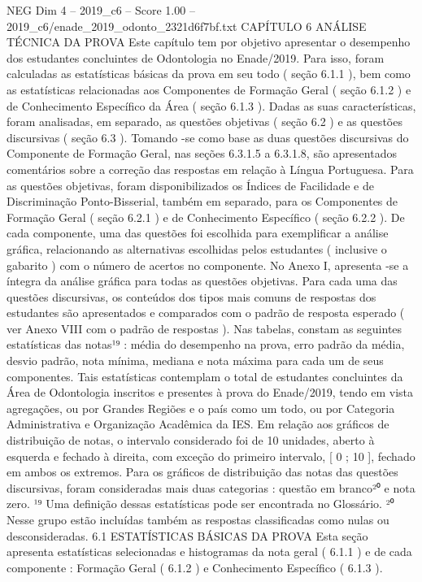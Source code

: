 \begin{textsample}{NEG Dim 4 – 2019\_c6 – Score 1.00 – 2019\_c6/enade\_2019\_odonto\_2321d6f7bf.txt}  \label{ex:f4_neg_259}
CAPÍTULO 6 ANÁLISE TÉCNICA DA PROVA Este capítulo tem por objetivo apresentar o desempenho dos estudantes concluintes de Odontologia no Enade/2019.
Para isso, foram calculadas as estatísticas básicas da prova em seu todo ( seção 6.1.1 ), bem como as estatísticas relacionadas aos Componentes de Formação Geral ( seção 6.1.2 ) e de Conhecimento Específico da Área ( seção 6.1.3 ).
Dadas as suas características, foram analisadas, em separado, as questões objetivas ( seção 6.2 ) e as questões discursivas ( seção 6.3 ).
Tomando -se como base as duas questões discursivas do Componente de Formação Geral, nas seções 6.3.1.5 a 6.3.1.8, são apresentados comentários sobre a correção das respostas em relação à Língua Portuguesa.
Para as questões objetivas, foram disponibilizados os Índices de Facilidade e de Discriminação Ponto-Bisserial, também em separado, para os Componentes de Formação Geral ( seção 6.2.1 ) e de Conhecimento Específico ( seção 6.2.2 ).
De cada componente, uma das questões foi escolhida para exemplificar a análise gráfica, relacionando as alternativas escolhidas pelos estudantes ( inclusive o gabarito ) com o número de acertos no componente.
No Anexo I, apresenta -se a íntegra da análise gráfica para todas as questões objetivas.
Para cada uma das questões discursivas, os conteúdos dos tipos mais comuns de respostas dos estudantes são apresentados e comparados com o padrão de resposta esperado ( ver Anexo VIII com o padrão de respostas ).
Nas tabelas, constam as seguintes estatísticas das notas¹⁹ : média do desempenho na prova, erro padrão da média, desvio padrão, nota mínima, mediana e nota máxima para cada um de seus componentes.
Tais estatísticas contemplam o total de estudantes concluintes da Área de Odontologia inscritos e presentes à prova do Enade/2019, tendo em vista agregações, ou por Grandes Regiões e o país como um todo, ou por Categoria Administrativa e Organização Acadêmica da IES.
Em relação aos gráficos de distribuição de notas, o intervalo considerado foi de 10 unidades, aberto à esquerda e fechado à direita, com exceção do primeiro intervalo, [ 0 ; 10 ], fechado em ambos os extremos.
Para os gráficos de distribuição das notas das questões discursivas, foram consideradas mais duas categorias : questão em branco²⁰ e nota zero. ¹⁹ Uma definição dessas estatísticas pode ser encontrada no Glossário. ²⁰ Nesse grupo estão incluídas também as respostas classificadas como nulas ou desconsideradas. 6.1 ESTATÍSTICAS BÁSICAS DA PROVA Esta seção apresenta estatísticas selecionadas e histogramas da nota geral ( 6.1.1 ) e de cada componente : Formação Geral ( 6.1.2 ) e Conhecimento Específico ( 6.1.3 ).

\end{textsample}
